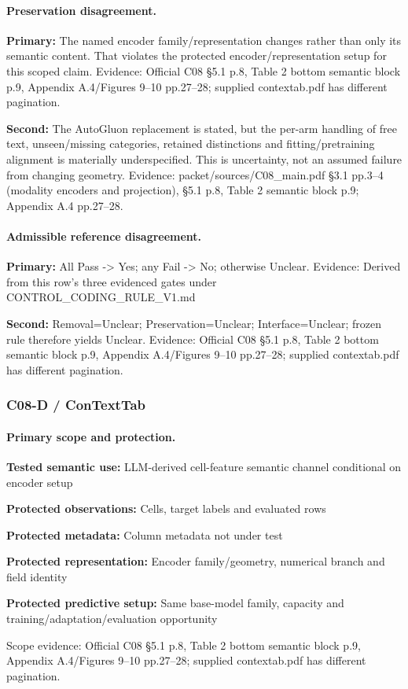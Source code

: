 \documentclass[10pt]{article}
\begin{document}
\paragraph{Preservation disagreement.}
\textbf{Primary:} The named encoder family/representation changes rather than only its semantic content. That violates the protected encoder/representation setup for this scoped claim. Evidence: Official C08 §5.1 p.8, Table 2 bottom semantic block p.9, Appendix A.4/Figures 9--10 pp.27--28; supplied contextab.pdf has different pagination.\par
\textbf{Second:} The AutoGluon replacement is stated, but the per-arm handling of free text, unseen/missing categories, retained distinctions and fitting/pretraining alignment is materially underspecified. This is uncertainty, not an assumed failure from changing geometry. Evidence: packet/sources/C08\_main.pdf §3.1 pp.3--4 (modality encoders and projection), §5.1 p.8, Table 2 semantic block p.9; Appendix A.4 pp.27--28.\par
\paragraph{Admissible reference disagreement.}
\textbf{Primary:} All Pass -> Yes; any Fail -> No; otherwise Unclear. Evidence: Derived from this row’s three evidenced gates under CONTROL\_CODING\_RULE\_V1.md\par
\textbf{Second:} Removal=Unclear; Preservation=Unclear; Interface=Unclear; frozen rule therefore yields Unclear. Evidence: Official C08 §5.1 p.8, Table 2 bottom semantic block p.9, Appendix A.4/Figures 9--10 pp.27--28; supplied contextab.pdf has different pagination.\par
\subsubsection*{C08-D / ConTextTab}
\paragraph{Primary scope and protection.}
\textbf{Tested semantic use:} LLM-derived cell-feature semantic channel conditional on encoder setup\par
\textbf{Protected observations:} Cells, target labels and evaluated rows\par
\textbf{Protected metadata:} Column metadata not under test\par
\textbf{Protected representation:} Encoder family/geometry, numerical branch and field identity\par
\textbf{Protected predictive setup:} Same base-model family, capacity and training/adaptation/evaluation opportunity\par
Scope evidence: Official C08 §5.1 p.8, Table 2 bottom semantic block p.9, Appendix A.4/Figures 9--10 pp.27--28; supplied contextab.pdf has different pagination.\par
\end{document}
